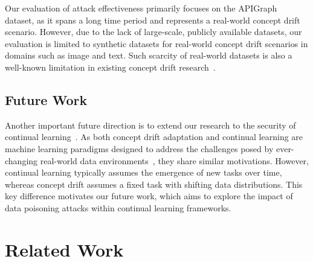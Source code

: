 \documentclass[conference,compsoc]{IEEEtran} %
\providecommand{\DIFaddend}{} %
\DeclareRobustCommand{\DIFaddend}{\DIFOaddend \let\includegraphics\DIFOincludegraphics} %
\begin{document}
\DIFaddend Our evaluation of attack effectiveness primarily focuses on the APIGraph~\cite{2020-CCS-APIGraph} dataset, as it spans a long time period and represents a real-world concept drift scenario.
However, due to the lack of large-scale, publicly available datasets, our evaluation is limited to synthetic datasets for real-world concept drift scenarios in domains such as image and text.
Such scarcity of real-world datasets is also a well-known limitation in existing concept drift research~\cite{ganguly2023online,2023-Usenix-chenyizhen,2021-Usenix-CDAE}.

\subsection{Future Work}
Another important future direction is to extend our research to the security of continual learning~\cite{han2023data,guo2024persistent}.
As both concept drift adaptation and continual learning are machine learning paradigms designed to address the challenges posed by ever-changing real-world data environments~\cite{wang2024comprehensive}, they share similar motivations. 
However, continual learning typically assumes the emergence of new tasks over time, whereas concept drift assumes a fixed task with shifting data distributions.
This key difference motivates our future work, which aims to explore the impact of data poisoning attacks within continual learning frameworks.

\noindent 

		\section{Related Work}
\label{sec: Related work}
%
\end{document}
